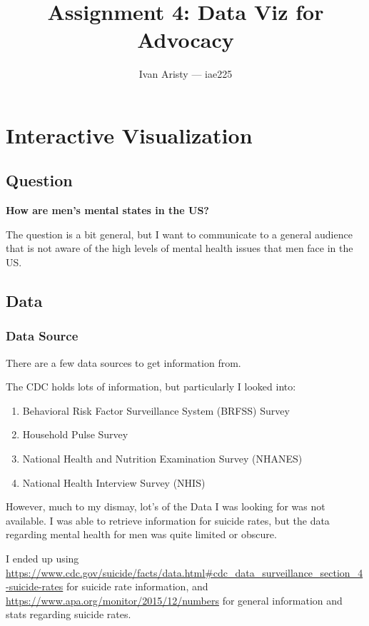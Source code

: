 \documentclass{article}
\title{Assignment 4: Data Viz for Advocacy}
\author{Ivan Aristy — iae225}
\begin{document}
  \maketitle %
  \thispagestyle{empty}

\section{Interactive Visualization}

\subsection{Question}
\label{subsec:subsec1}

\textbf{How are men's mental states in the US?}

The question is a bit general, but I want to communicate to a general audience
that is not aware of the high levels of mental health issues that men face in the US.

\subsection{Data}
\label{subsec:subsec2}

\subsubsection{Data Source}
\label{subsubsec:Data Source}

There are a few data sources to get information from.

The CDC holds lots of information, but particularly I looked into:

\begin{enumerate}
  \item Behavioral Risk Factor Surveillance System (BRFSS) Survey
  \item Household Pulse Survey
  \item National Health and Nutrition Examination Survey (NHANES)
  \item National Health Interview Survey (NHIS)
\end{enumerate}

However, much to my dismay, lot's of the Data I was looking for 
was not available. I was able to retrieve information for suicide rates,
but the data regarding mental health for men was quite limited or obscure.

I ended up using \url{https://www.cdc.gov/suicide/facts/data.html#cdc_data_surveillance_section_4-suicide-rates}
for suicide rate information, and \url{https://www.apa.org/monitor/2015/12/numbers}
for general information and stats regarding suicide rates.
\end{document}
